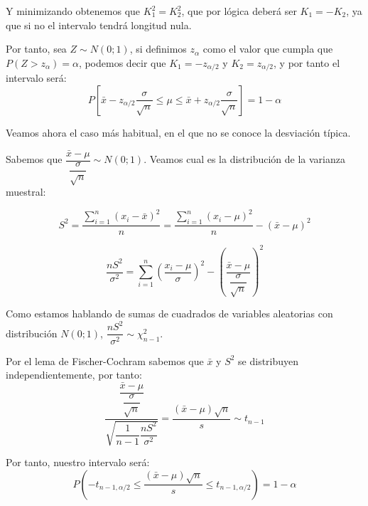Y minimizando obtenemos que $K_1^2=K_2^2$, que por l\'ogica deber\'a ser $K_1=-K_2$, ya que si no el intervalo tendr\'a longitud nula.

Por tanto, sea $Z\sim N(0;1)$, si definimos $z_{\alpha}$ como el valor que cumpla que $P(Z>z_{\alpha})=\alpha$, podemos decir que $K_1=-z_{\alpha/2}$ y $K_2=z_{\alpha/2}$, y por tanto el intervalo ser\'a:
\begin{equation*}
P[\bar{x}-z_{\alpha/2}\dfrac{\sigma}{\sqrt{n}}\leq\mu\leq\bar{x}+z_{\alpha/2}\dfrac{\sigma}{\sqrt{n}}]=1-\alpha
\end{equation*}


Veamos ahora el caso m\'as habitual, en el que no se conoce la desviaci\'on t\'ipica.

Sabemos que $\dfrac{\bar{x}-\mu}{\dfrac{\sigma}{\sqrt{n}}}\sim N(0;1)$.
Veamos cual es la distribuci\'on de la varianza muestral:

\begin{equation*}
S^2=\dfrac{\sum_{i=1}^n\left(x_i-\bar{x}\right)^2}{n}=\dfrac{\sum_{i=1}^n\left(x_i-\mu\right)^2}{n}-\left(\bar{x}-\mu\right)^2
\end{equation*}

\begin{equation*}
\dfrac{nS^2}{\sigma^2}=\sum_{i=1}^n\left(\dfrac{x_i-\mu}{\sigma}\right)^2-\left(\dfrac{\bar{x}-\mu}{\dfrac{\sigma}{\sqrt{n}}}\right)^2
\end{equation*}

Como estamos hablando de sumas de cuadrados de variables aleatorias con distribuci\'on $N(0;1)$, $\dfrac{nS^2}{\sigma^2}\sim\chi^2_{n-1}$.

Por el lema de Fischer-Cochram sabemos que $\bar{x}$ y $S^2$ se distribuyen independientemente, por tanto:
\begin{equation*}
\dfrac{\dfrac{\bar{x}-\mu}{\dfrac{\sigma}{\sqrt{n}}}}{\sqrt{\dfrac{1}{n-1}\dfrac{nS^2}{\sigma^2}}}=\dfrac{(\bar{x}-\mu)\sqrt{n}}{s}\sim t_{n-1}
\end{equation*}

Por tanto, nuestro intervalo ser\'a:
\begin{equation*}
P\left(-t_{n-1,\alpha/2}\leq\dfrac{(\bar{x}-\mu)\sqrt{n}}{s}\leq t_{n-1,\alpha/2}\right)=1-\alpha
\end{equation*}



